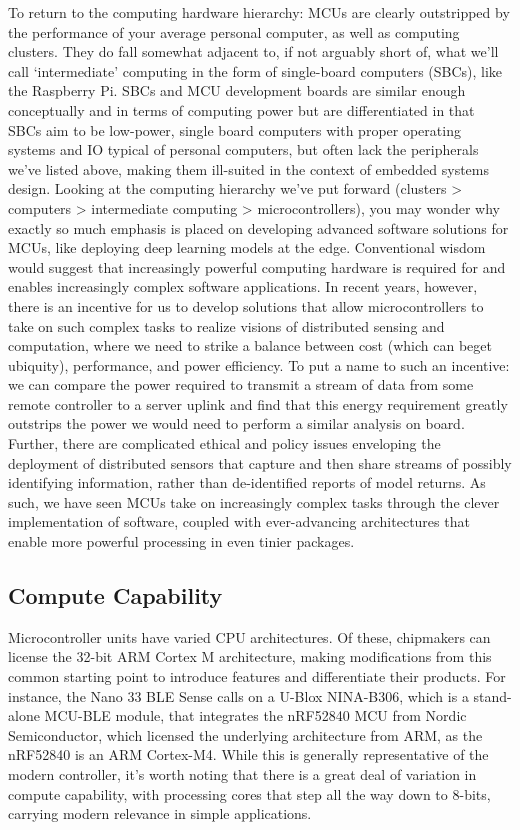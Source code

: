To return to the computing hardware hierarchy: MCUs are clearly outstripped by the performance of your average personal computer, as well as computing clusters. They do fall somewhat adjacent to, if not arguably short of, what we’ll call ‘intermediate’ computing in the form of single-board computers (SBCs), like the Raspberry Pi. SBCs and MCU development boards are similar enough conceptually and in terms of computing power but are differentiated in that SBCs aim to be low-power, single board computers with proper operating systems and IO typical of personal computers, but often lack the peripherals we’ve listed above, making them ill-suited in the context of embedded systems design. Looking at the computing hierarchy we’ve put forward (clusters > computers > intermediate computing > microcontrollers), you may wonder why exactly so much emphasis is placed on developing advanced software solutions for MCUs, like deploying deep learning models at the edge. Conventional wisdom would suggest that increasingly powerful computing hardware is required for and enables increasingly complex software applications. In recent years, however, there is an incentive for us to develop solutions that allow microcontrollers to take on such complex tasks to realize visions of distributed sensing and computation, where we need to strike a balance between cost (which can beget ubiquity), performance, and power efficiency. To put a name to such an incentive: we can compare the power required to transmit a stream of data from some remote controller to a server uplink and find that this energy requirement greatly outstrips the power we would need to perform a similar analysis on board. Further, there are complicated ethical and policy issues enveloping the deployment of distributed sensors that capture and then share streams of possibly identifying information, rather than de-identified reports of model returns. As such, we have seen MCUs take on increasingly complex tasks through the clever implementation of software, coupled with ever-advancing architectures that enable more powerful processing in even tinier packages.

\subsection{Compute Capability}

Microcontroller units have varied CPU architectures. Of these, chipmakers can license the 32-bit ARM Cortex M architecture, making modifications from this common starting point to introduce features and differentiate their products. For instance, the Nano 33 BLE Sense calls on a U-Blox NINA-B306, which is a stand-alone MCU-BLE module, that integrates the nRF52840 MCU from Nordic Semiconductor, which licensed the underlying architecture from ARM, as the nRF52840 is an ARM Cortex-M4. While this is generally representative of the modern controller, it’s worth noting that there is a great deal of variation in compute capability, with processing cores that step all the way down to 8-bits, carrying modern relevance in simple applications.


